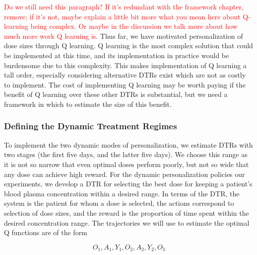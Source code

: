 \textcolor{red}{Do we still need this paragraph? If it's redundant with the framework chapter, remove; if it's not, maybe explain a little bit more what you mean here about Q-learning being complex. Or maybe in the discussion we talk more about how much more work Q learning is.}
Thus far, we have motivated personalization of dose sizes through Q learning.  Q learning is the most complex solution that could be implemented at this time, and its implementation in practice would be burdensome due to this complexity. This makes implementation of Q learning a tall order, especially considering alternative DTRs exist which are not as costly to implement. The cost of implementing Q learning may be worth paying if the benefit of Q learning over these other DTRs is substantial, but we need a framework in which to estimate the size of this benefit. 

\subsubsection{Defining the Dynamic Treatment Regimes}

To implement the two dynamic modes of personalization, we estimate DTRs with two stages (the first five days, and the latter five days). We choose this range as it is not so narrow that even optimal doses perform poorly, but not so wide that any dose can achieve high reward. For the dynamic personalization policies our experiments, we develop a DTR for selecting the best dose for keeping a patient’s blood plasma concentration within a desired range.  In terms of the DTR, the system is the patient for whom a dose is selected, the actions correspond to selection of dose sizes, and the reward is the proportion of time spent within the desired concentration range. The trajectories we will use to estimate the optimal Q functions are of the form

\begin{equation}\label{key}
O_1, A_1, Y_1, O_2, A_2, Y_2, O_3
\end{equation}

